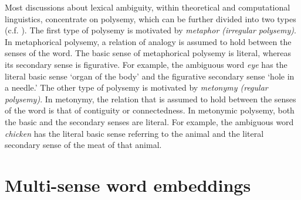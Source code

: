 \documentclass[11pt]{article}
\begin{document}
Most discussions about lexical ambiguity, within theoretical and computational
linguistics, concentrate on polysemy, which can be further divided into two
types (c.f. \cite{Apresjan:1974,Pustejovsky:1995}). The first type of polysemy
is motivated by \emph{metaphor (irregular polysemy)}. In metaphorical polysemy,
a relation of analogy is assumed to hold between the senses of the word. The
basic sense of metaphorical polysemy is literal, whereas its secondary sense is
figurative. For example, the ambiguous word \emph{eye} has the literal basic
sense  `organ of the body' and the figurative secondary sense `hole in a
needle.' The other type of polysemy is motivated by \emph{metonymy (regular
polysemy)}. In metonymy, the relation that is assumed to hold between the
senses of the word is that of contiguity or connectedness.
In metonymic polysemy, both the basic and the secondary senses are literal. For
example, the ambiguous word \emph{chicken} has the literal basic sense
referring to the animal and the literal secondary sense of the meat of that
animal.

%


\section{Multi-sense word embeddings}
\end{document}
